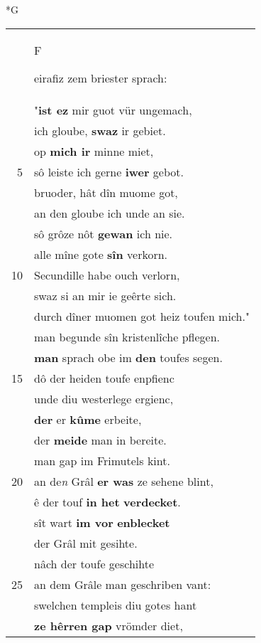 \documentclass[8pt,a4paper,notitlepage]{article}
\begin{document}
\newpage
\begin{table}[ht]
\begin{minipage}[t]{0.5\linewidth}
\small
\begin{center}*G
\end{center}
\begin{tabular}{rl}
 & \begin{large}F\end{large}eirafiz zem briester sprach:\\ 
 & "\textbf{ist ez} mir guot vür ungemach,\\ 
 & ich gloube, \textbf{swaz} ir gebiet.\\ 
 & op \textbf{mich ir} minne miet,\\ 
5 & sô leiste ich gerne \textbf{iwer} gebot.\\ 
 & bruoder, hât dîn muome got,\\ 
 & an den gloube ich unde an sie.\\ 
 & sô grôze nôt \textbf{gewan} ich nie.\\ 
 & alle mîne gote \textbf{sîn} verkorn.\\ 
10 & Secundille habe ouch verlorn,\\ 
 & swaz si an mir ie geêrte sich.\\ 
 & durch dîner muomen got heiz toufen mich."\\ 
 & man begunde sîn kristenlîche pflegen.\\ 
 & \textbf{man} sprach obe im \textbf{den} toufes segen.\\ 
15 & dô der heiden toufe enpfienc\\ 
 & unde diu westerlege ergienc,\\ 
 & \textbf{der} er \textbf{kûme} erbeite,\\ 
 & der \textbf{meide} man in bereite.\\ 
 & man gap im Frimutels kint.\\ 
20 & an de\textit{n} Grâl \textbf{er was} ze sehene blint,\\ 
 & ê der touf \textbf{in het} \textbf{verdecket}.\\ 
 & sît wart \textbf{im vor} \textbf{enblecket}\\ 
 & der Grâl mit gesihte.\\ 
 & nâch der toufe geschihte\\ 
25 & an dem Grâle man geschriben vant:\\ 
 & swelchen templeis diu gotes hant\\ 
 & \textbf{ze hêrren gap} vrömder diet,\\ 

\end{tabular}
\end{minipage}
\end{table}
\end{document}
